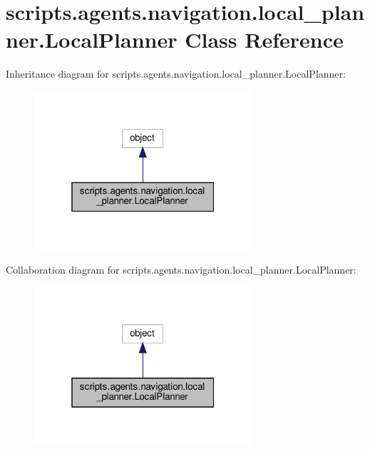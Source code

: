 \hypertarget{classscripts_1_1agents_1_1navigation_1_1local__planner_1_1LocalPlanner}{}\section{scripts.\+agents.\+navigation.\+local\+\_\+planner.\+Local\+Planner Class Reference}
\label{classscripts_1_1agents_1_1navigation_1_1local__planner_1_1LocalPlanner}


Inheritance diagram for scripts.\+agents.\+navigation.\+local\+\_\+planner.\+Local\+Planner\+:
\nopagebreak
\begin{figure}[H]
\begin{center}
\leavevmode
\includegraphics[width=229pt]{d1/d35/classscripts_1_1agents_1_1navigation_1_1local__planner_1_1LocalPlanner__inherit__graph}
\end{center}
\end{figure}


Collaboration diagram for scripts.\+agents.\+navigation.\+local\+\_\+planner.\+Local\+Planner\+:
\nopagebreak
\begin{figure}[H]
\begin{center}
\leavevmode
\includegraphics[width=229pt]{d5/d45/classscripts_1_1agents_1_1navigation_1_1local__planner_1_1LocalPlanner__coll__graph}
\end{center}
\end{figure}
